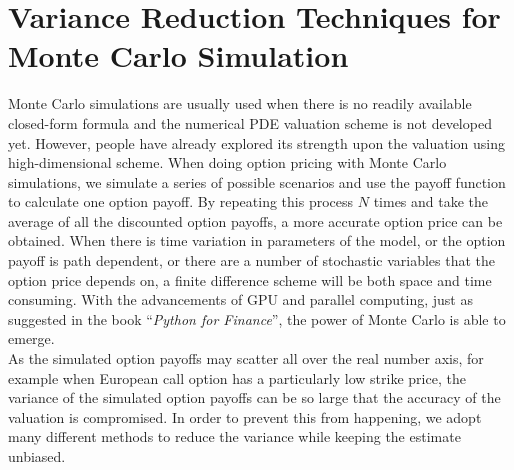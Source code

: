 \section{Variance Reduction Techniques for Monte Carlo Simulation}
Monte Carlo simulations are usually used when there is no readily available closed-form formula and the numerical PDE valuation scheme is not developed yet. However, people have already explored its strength upon the valuation using high-dimensional scheme. When doing option pricing with Monte Carlo simulations, we simulate a series of possible scenarios and use the payoff function to calculate one option payoff. By repeating this process $N$ times and take the average of all the discounted option payoffs, a more accurate option price can be obtained. When there is time variation in parameters of the model, or the option payoff is path dependent, or there are a number of stochastic variables that the option price depends on, a finite difference scheme will be both space and time consuming. With the advancements of GPU and parallel computing, just as suggested in the book ``\emph{Python for Finance}''\cite{PythonForFinance}, the power of Monte Carlo is able to emerge.\\[3mm]
As the simulated option payoffs may scatter all over the real number axis, for example when European call option has a particularly low strike price, the variance of the simulated option payoffs can be so large that the accuracy of the valuation is compromised. In order to prevent this from happening, we adopt many different methods to reduce the variance while keeping the estimate unbiased. \cite{VarianceReduction}
\newpage
